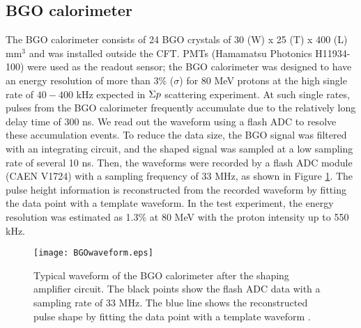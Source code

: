 %
\subsection{BGO calorimeter}
The BGO calorimeter consists of 24 BGO crystals of 30 (W) x 25 (T) x 400 (L) mm$^{3}$ and was installed outside the CFT. PMTs (Hamamatsu Photonics H11934-100) were used as the readout sensor; the BGO calorimeter was designed to have an energy resolution of more than 3\% ($\sigma$) for 80 MeV protons at the high single rate of $40-400$ kHz expected in $\Sigma p$ scattering experiment. At such single rates, pulses from the BGO calorimeter frequently accumulate due to the relatively long delay time of 300 ns. We read out the waveform using a flash ADC to resolve these accumulation events. To reduce the data size, the BGO signal was filtered with an integrating circuit, and the shaped signal was sampled at a low sampling rate of several 10 ns. Then, the waveforms were recorded by a flash ADC module (CAEN V1724) with a sampling frequency of 33 MHz, as shown in Figure \ref{fig-BGOwaveform}. The pulse height information is reconstructed from the recorded waveform by fitting the data point with a template waveform. In the test experiment, the energy resolution was estimated as 1.3\% at 80 MeV with the proton intensity up to 550 kHz.
\begin{figure}[!h]
 \begin{center}
   \texttt{[image: BGOwaveform.eps]}
   \caption{Typical waveform of the BGO calorimeter after the shaping amplifier circuit. The black points show the flash ADC data with a sampling rate of 33 MHz. The blue line shows the reconstructed pulse shape by fitting the data point with a template waveform \cite{Aka-2020}.}
   \label{fig-BGOwaveform}
 \end{center}
\end{figure}

%
